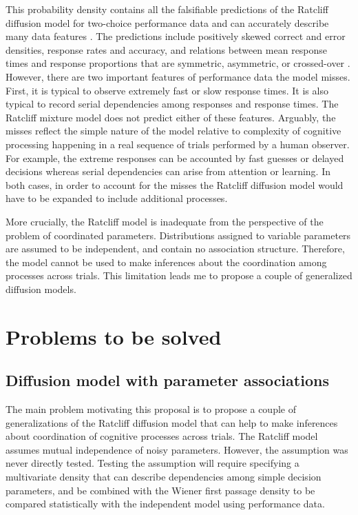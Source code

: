 \documentclass[12pt]{article}
\begin{document}
	This probability density contains all the falsifiable predictions of the Ratcliff diffusion model for two-choice performance data and can accurately describe many data features \citep{Rat2002}. The predictions include positively skewed correct and error densities, response rates and accuracy, and relations between mean response times and response proportions that are symmetric, asymmetric, or crossed-over \citep{RatMck2008,Wag2009}. However, there are two important features of performance data the model misses. First, it is typical to observe extremely fast or slow response times. It is also typical to record serial dependencies among responses and response times. The Ratcliff mixture model does not predict either of these features. Arguably, the misses reflect the simple nature of the model relative to complexity of cognitive processing happening in a real sequence of trials performed by a human observer. For example, the extreme responses can be accounted by fast guesses or delayed decisions whereas serial dependencies can arise from attention or learning. In both cases, in order to account for the misses the Ratcliff diffusion model would have to be expanded to include additional processes. 
    
	More crucially, the Ratcliff model is inadequate from the perspective of the problem of coordinated parameters. Distributions assigned to variable parameters are assumed to be independent, and contain no association structure. Therefore, the model cannot be used to make inferences about the coordination among processes across trials. This limitation leads me to propose a couple of generalized diffusion models.

\section{Problems to be solved}
\subsection{Diffusion model with parameter associations}
	The main problem motivating this proposal is to propose a couple of generalizations of the Ratcliff diffusion model that can help to make inferences about coordination of cognitive processes across trials. The Ratcliff model assumes mutual independence of noisy parameters. However, the assumption was never directly tested. Testing the assumption will require specifying a multivariate density that can describe dependencies among simple decision parameters, and be combined with the Wiener first passage density to be compared statistically with the independent model using performance data.
    
\end{document}
